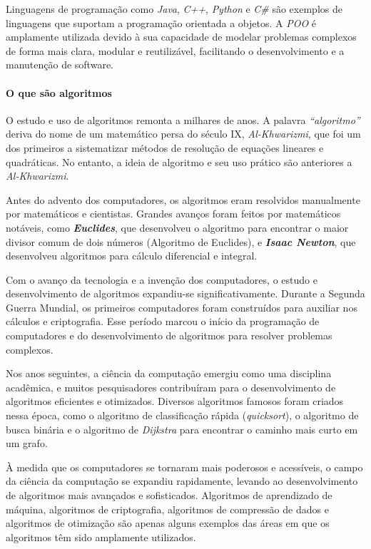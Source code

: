 \documentclass[a4paper, 12pt, onecolumn,singlespacing]{article}
\begin{document}
	Linguagens de programação como \textit{Java}, \textit{C++}, \textit{Python} e \textit{C\#} são exemplos de linguagens que suportam a programação orientada a objetos. A \textit{POO} é amplamente utilizada devido à sua capacidade de modelar problemas complexos de forma mais clara, modular e reutilizável, facilitando o desenvolvimento e a manutenção de software.
	
	\paragraph{O que são algoritmos}
	 \label{o_que_sao_algoritmos} O estudo e uso de algoritmos remonta a milhares de anos. A palavra \textit{``algoritmo''} deriva do nome de um matemático persa do século IX, \textit{Al-Khwarizmi}, que foi um dos primeiros a sistematizar métodos de resolução de equações lineares e quadráticas. No entanto, a ideia de algoritmo e seu uso prático são anteriores a \textit{Al-Khwarizmi}.
	
	Antes do advento dos computadores, os algoritmos eram resolvidos manualmente por matemáticos e cientistas. Grandes avanços foram feitos por matemáticos notáveis, como \textit{\textbf{Euclides}}, que desenvolveu o algoritmo para encontrar o maior divisor comum de dois números (Algoritmo de Euclides), e \textbf{\textit{\textit{Isaac Newton}}}, que desenvolveu algoritmos para cálculo diferencial e integral.
	
	Com o avanço da tecnologia e a invenção dos computadores, o estudo e desenvolvimento de algoritmos expandiu-se significativamente. Durante a Segunda Guerra Mundial, os primeiros computadores foram construídos para auxiliar nos cálculos e criptografia. Esse período marcou o início da programação de computadores e do desenvolvimento de algoritmos para resolver problemas complexos.
	
	Nos anos seguintes, a ciência da computação emergiu como uma disciplina acadêmica, e muitos pesquisadores contribuíram para o desenvolvimento de algoritmos eficientes e otimizados. Diversos algoritmos famosos foram criados nessa época, como o algoritmo de classificação rápida (\textit{quicksort}), o algoritmo de busca binária e o algoritmo de \textit{Dijkstra\textbf{}} para encontrar o caminho mais curto em um grafo.
	
	À medida que os computadores se tornaram mais poderosos e acessíveis, o campo da ciência da computação se expandiu rapidamente, levando ao desenvolvimento de algoritmos mais avançados e sofisticados. Algoritmos de aprendizado de máquina, algoritmos de criptografia, algoritmos de compressão de dados e algoritmos de otimização são apenas alguns exemplos das áreas em que os algoritmos têm sido amplamente utilizados.
	
\end{document}
